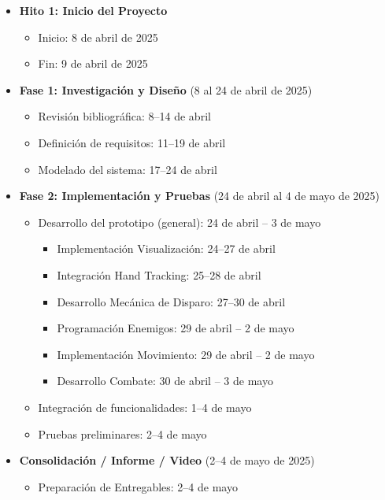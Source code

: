 \documentclass[journal,article,accept,pdftex,moreauthors]{Definitions/mdpi}
\begin{document}
\begin{itemize}
    \item \textbf{Hito 1: Inicio del Proyecto}
    \begin{itemize}
        \item Inicio: 8 de abril de 2025
        \item Fin: 9 de abril de 2025
    \end{itemize}

    \item \textbf{Fase 1: Investigación y Diseño} (8 al 24 de abril de 2025) %
    \begin{itemize}
        \item Revisión bibliográfica: 8–14 de abril %
        \item Definición de requisitos: 11–19 de abril %
        \item Modelado del sistema: 17–24 de abril %
    \end{itemize}

    \item \textbf{Fase 2: Implementación y Pruebas} (24 de abril al 4 de mayo de 2025) %
    \begin{itemize}
        \item Desarrollo del prototipo (general): 24 de abril – 3 de mayo %
        \begin{itemize}
            \item Implementación Visualización: 24–27 de abril %
            \item Integración Hand Tracking: 25–28 de abril %
            \item Desarrollo Mecánica de Disparo: 27–30 de abril %
            \item Programación Enemigos: 29 de abril – 2 de mayo %
            \item Implementación Movimiento: 29 de abril – 2 de mayo %
            \item Desarrollo Combate: 30 de abril – 3 de mayo %
        \end{itemize}
        \item Integración de funcionalidades: 1–4 de mayo %
        \item Pruebas preliminares: 2–4 de mayo %
    \end{itemize}
    
    \item \textbf{Consolidación / Informe / Video} (2–4 de mayo de 2025) %
    \begin{itemize}
        \item Preparación de Entregables: 2–4 de mayo 
    \end{itemize}


\end{itemize}
\end{document}
